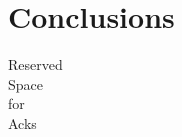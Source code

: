 \section{Conclusions}
\label{sec:conclusions}




\begin{acks}

  Reserved\\
  Space\\
  for\\
  Acks

\end{acks}
